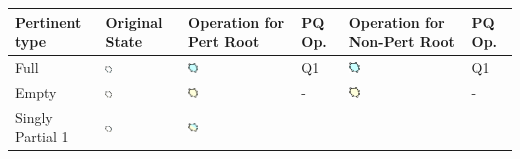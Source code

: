 \documentclass[a4]{jgaa-art}
\begin{document}
\begin{appendices}
\begin{table}[h]
  \def\arraystretch{1}
  \centering
  \begin{tabular}
      {|C{0.22\textwidth}|C{0.14\textwidth}|C{0.14\textwidth}|C{0.05\textwidth}|C{0.14\textwidth}|C{0.05\textwidth}|}
      \hline 
      Pertinent type & Original State & Operation for Pert Root & PQ Op. & Operation for Non-Pert Root & PQ Op.\\
      \hline
      Full&
      \includegraphics[width=0.1\textwidth]{bc_transform_bl_01_before} &
      \includegraphics[width=0.1\textwidth]{bc_transform_bl_01_root} &
      Q1 &
      \includegraphics[width=0.1\textwidth]{bc_transform_bl_01_nonroot} &
      Q1 \\
      \hline
      Empty&
      \includegraphics[width=0.1\textwidth]{bc_transform_bl_12_before} &
      \includegraphics[width=0.1\textwidth]{bc_transform_bl_12_root} &
      - &
      \includegraphics[width=0.1\textwidth]{bc_transform_bl_12_nonroot} &
      - \\
      \hline
      Singly Partial 1&
      \includegraphics[width=0.1\textwidth]{bc_transform_bl_02_before} &
      \includegraphics[width=0.1\textwidth]{bc_transform_bl_02_root} &

\end{tabular}
\end{table}
\end{appendices}
\end{document}
